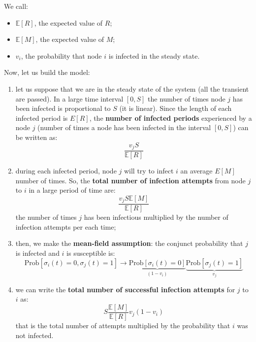 \documentclass[../main/main.tex]{subfiles}
\begin{document}
We call:
\begin{itemize}
\item \( \mathbb{E}[R] \), the expected value of \( R \);
\item \( \mathbb{E}[M] \), the expected value of \( M \);
\item \( v_i \), the probability that node \( i \) is infected in the steady state.
\end{itemize}



Now, let us build the model:
\begin{enumerate}
\item let us suppose that we are in the steady state of the system (all the transient are passed).
In a large time interval \( [0,S] \) the number of times node \( j \) has been infected is proportional to \( S \) (it is linear).
Since the length of each infected period is \( E[R] \), the \textbf{number of infected periods} experienced by a node \( j \) (number of times a node has been infected in the interval \( [0,S] \)) can be written as:
\begin{equation*}
  \frac{v_j S}{\mathbb{E}[R]}
\end{equation*}

\item during each infected period, node \( j \) will try to infect \( i \) an average \( E[M] \) number of times. So, the \textbf{total number of infection attempts} from node \( j \) to \( i \) in a large period of time are:
\begin{equation*}
  \frac{v_j S \mathbb{E}[M]}{\mathbb{E}[R]}
\end{equation*}
the number of times \( j \) has been infectious multiplied by the number of infection attempts per each time;

\item then, we make the \textbf{mean-field assumption}: the  conjunct probability that $j$ is infected and $i$ is susceptible is:
\begin{equation*}
  \text{Prob} [ \sigma _i (t)=0, \sigma _j (t)=1] \rightarrow \underbrace{\text{Prob} [\sigma _i (t) = 0]}_{(1-v_i)} \underbrace{\text{Prob} [\sigma _j (t) = 1]}_{v_j}
\end{equation*}

\item we can write the \textbf{total number of successful infection attempts} for \( j \) to \( i \) as:
\begin{equation*}
  S \frac{\mathbb{E}[M]}{\mathbb{E}[R] } v_j (1-v_i)
\end{equation*}
that is the total number of attempts multiplied by the probability that $i$ was not infected.


\end{enumerate}
\end{document}
